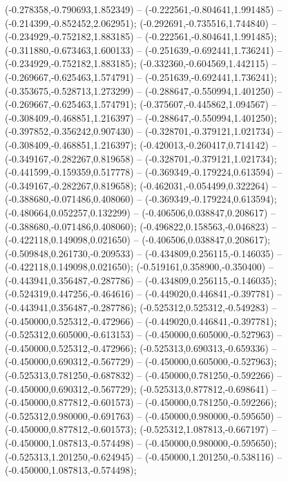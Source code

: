  (-0.278358,-0.790693,1.852349) -- (-0.222561,-0.804641,1.991485) -- (-0.214399,-0.852452,2.062951);
 (-0.292691,-0.735516,1.744840) -- (-0.234929,-0.752182,1.883185) -- (-0.222561,-0.804641,1.991485);
 (-0.311880,-0.673463,1.600133) -- (-0.251639,-0.692441,1.736241) -- (-0.234929,-0.752182,1.883185);
 (-0.332360,-0.604569,1.442115) -- (-0.269667,-0.625463,1.574791) -- (-0.251639,-0.692441,1.736241);
 (-0.353675,-0.528713,1.273299) -- (-0.288647,-0.550994,1.401250) -- (-0.269667,-0.625463,1.574791);
 (-0.375607,-0.445862,1.094567) -- (-0.308409,-0.468851,1.216397) -- (-0.288647,-0.550994,1.401250);
 (-0.397852,-0.356242,0.907430) -- (-0.328701,-0.379121,1.021734) -- (-0.308409,-0.468851,1.216397);
 (-0.420013,-0.260417,0.714142) -- (-0.349167,-0.282267,0.819658) -- (-0.328701,-0.379121,1.021734);
 (-0.441599,-0.159359,0.517778) -- (-0.369349,-0.179224,0.613594) -- (-0.349167,-0.282267,0.819658);
 (-0.462031,-0.054499,0.322264) -- (-0.388680,-0.071486,0.408060) -- (-0.369349,-0.179224,0.613594);
 (-0.480664,0.052257,0.132299) -- (-0.406506,0.038847,0.208617) -- (-0.388680,-0.071486,0.408060);
 (-0.496822,0.158563,-0.046823) -- (-0.422118,0.149098,0.021650) -- (-0.406506,0.038847,0.208617);
 (-0.509848,0.261730,-0.209533) -- (-0.434809,0.256115,-0.146035) -- (-0.422118,0.149098,0.021650);
 (-0.519161,0.358900,-0.350400) -- (-0.443941,0.356487,-0.287786) -- (-0.434809,0.256115,-0.146035);
 (-0.524319,0.447256,-0.464616) -- (-0.449020,0.446841,-0.397781) -- (-0.443941,0.356487,-0.287786);
 (-0.525312,0.525312,-0.549283) -- (-0.450000,0.525312,-0.472966) -- (-0.449020,0.446841,-0.397781);
 (-0.525312,0.605000,-0.613153) -- (-0.450000,0.605000,-0.527963) -- (-0.450000,0.525312,-0.472966);
 (-0.525313,0.690313,-0.659336) -- (-0.450000,0.690312,-0.567729) -- (-0.450000,0.605000,-0.527963);
 (-0.525313,0.781250,-0.687832) -- (-0.450000,0.781250,-0.592266) -- (-0.450000,0.690312,-0.567729);
 (-0.525313,0.877812,-0.698641) -- (-0.450000,0.877812,-0.601573) -- (-0.450000,0.781250,-0.592266);
 (-0.525312,0.980000,-0.691763) -- (-0.450000,0.980000,-0.595650) -- (-0.450000,0.877812,-0.601573);
 (-0.525312,1.087813,-0.667197) -- (-0.450000,1.087813,-0.574498) -- (-0.450000,0.980000,-0.595650);
 (-0.525313,1.201250,-0.624945) -- (-0.450000,1.201250,-0.538116) -- (-0.450000,1.087813,-0.574498);
